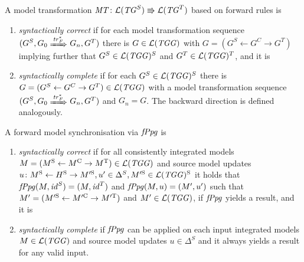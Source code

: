 \begin{definition}
\label{def:sec-gen-intro-compl:classical_corr_compl_mt}
A model transformation $\mathit{MT}\colon \mathcal{L}(\mathit{TG}^S) \Rrightarrow \mathcal{L}(\mathit{TG}^T)$ based on forward rules is
\begin{enumerate}
  \item \emph{syntactically correct} if for each model transformation sequence $(G^S,G_0 \Trans{\tr^*_F} G_n,G^T)$ there is $G \in \mathcal{L}(\mathit{TGG})$ with $G=(G^S \gets G^C \to G^T)$ implying further that $G^S \in \mathcal{L}(\mathit{TGG})^S$ and $G^T \in \mathcal{L}(\mathit{TGG})^T$, and it is
  \item \emph{syntactically complete} if for each $G^S \in \mathcal{L}(\mathit{TGG})^S$ there is $G=(G^S \gets G^C \to G^T) \in \mathcal{L}(\mathit{TGG})$ with a model transformation sequence $(G^S,G_0 \Trans{\tr^*_F} G_n,G^T)$ and $G_n=G$.
  The backward direction is defined analogously.
  \envEndMarker
\end{enumerate}
\end{definition}

\begin{definition}
A forward model synchronisation via $\mathit{fPpg}$ is
\begin{enumerate}
  \item \emph{syntactically correct} if for all consistently integrated models $M=(M^\mathrm{S} \gets M^\mathrm{C} \to M^\mathrm{T}) \in \mathcal{L}(\mathit{TGG})$ and source model updates $u\colon M^\SRC \gets H^\SRC \to M'^\SRC,u' \in \Delta^S,M'^\SRC \in \Lang(\TGG)^\SRC$ it holds that $\mathit{fPpg}(M,\mathit{id}^S)=(M,\mathit{id}^T)$ and $\mathit{fPpg}(M,u)=(M',u')$ such that $M'=(M'^\SRC \gets M'^\C \to M'^\T)$ and $M' \in \mathcal{L}(\mathit{TGG})$, if $\mathit{fPpg}$ yields a result, and it is
  \item \emph{syntactically complete} if $\mathit{fPpg}$ can be applied on each input integrated models $M \in \mathcal{L}(\mathit{TGG})$ and source model updates $u \in \Delta^S$ and it always yields a result for any valid input.
  \envEndMarker
\end{enumerate}
\end{definition}

